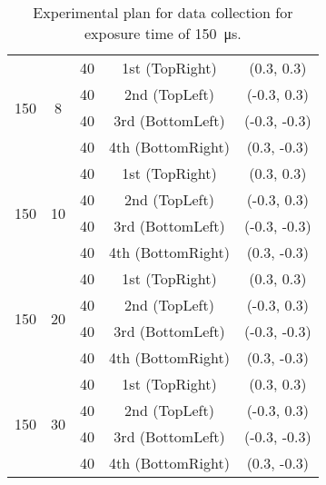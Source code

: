 \begin{table}[ht]
{\begin{tabular}{ccccc}
                    \midrule

                    \multirow{4}{*}{150} & \multirow{4}{*}{8} & 40 & 1st (\textsf{TopRight}) & (0.3, 0.3) \\
                    & & 40 & 2nd (\textsf{TopLeft}) & (-0.3, 0.3) \\
                    & & 40 & 3rd (\textsf{BottomLeft}) & (-0.3, -0.3) \\
                    & & 40 & 4th (\textsf{BottomRight}) & (0.3, -0.3) \\

                    \midrule

                    \multirow{4}{*}{150} & \multirow{4}{*}{10} & 40 & 1st (\textsf{TopRight}) & (0.3, 0.3) \\
                    & & 40 & 2nd (\textsf{TopLeft}) & (-0.3, 0.3) \\
                    & & 40 & 3rd (\textsf{BottomLeft}) & (-0.3, -0.3) \\
                    & & 40 & 4th (\textsf{BottomRight}) & (0.3, -0.3) \\

                    \midrule

                    \multirow{4}{*}{150} & \multirow{4}{*}{20} & 40 & 1st (\textsf{TopRight}) & (0.3, 0.3) \\
                    & & 40 & 2nd (\textsf{TopLeft}) & (-0.3, 0.3) \\
                    & & 40 & 3rd (\textsf{BottomLeft}) & (-0.3, -0.3) \\
                    & & 40 & 4th (\textsf{BottomRight}) & (0.3, -0.3) \\
                    
                    \midrule

                    \multirow{4}{*}{150} & \multirow{4}{*}{30} & 40 & 1st (\textsf{TopRight}) & (0.3, 0.3) \\
                    & & 40 & 2nd (\textsf{TopLeft}) & (-0.3, 0.3) \\
                    & & 40 & 3rd (\textsf{BottomLeft}) & (-0.3, -0.3) \\
                    & & 40 & 4th (\textsf{BottomRight}) & (0.3, -0.3) \\
                    \bottomrule
                \end{tabular}
                }
                \caption{Experimental plan for data collection for exposure time of \SI{150}{\micro\second}.}
                \label{table:exp_plan_gain}
            \end{table}
        
